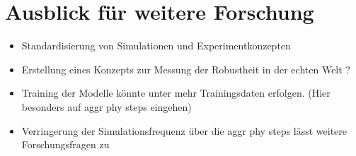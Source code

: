\section{Ausblick für weitere Forschung}


\begin{itemize}
    \item Standardisierung von Simulationen und Experimentkonzepten
    \item Erstellung eines Konzepts zur Messung der Robustheit in der echten Welt ?
    \item Training der Modelle könnte unter mehr Trainingsdaten erfolgen. (Hier besonders auf aggr phy steps eingehen)
    \item Verringerung der Simulationsfrequenz über die aggr phy steps lässt weitere Forschungsfragen zu
\end{itemize}